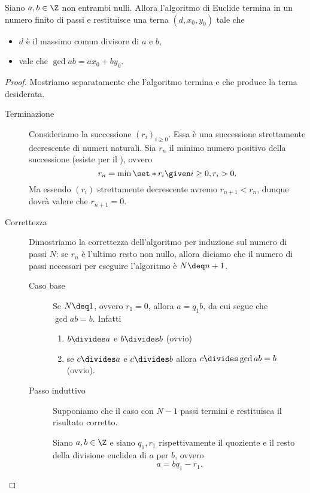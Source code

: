 \begin{theorem}
    Siano $a, b \in \Z$ non entrambi nulli. Allora l'algoritmo di Euclide termina in un numero finito di passi e restituisce una terna $(d, x_0, y_0)$ tale che \begin{itemize}
        \item $d$ è il massimo comun divisore di $a$ e $b$,
        \item vale che $\gcd{a}{b} = ax_0 + by_0$.
    \end{itemize}
\end{theorem}
\begin{proof}
    Mostriamo separatamente che l'algoritmo termina e che produce la terna desiderata.
    \begin{description}
        \item[Terminazione] Consideriamo la successione $(r_i)_{i\geq 0}$. Essa è una successione strettamente decrescente di numeri naturali. Sia $r_n$ il minimo numero positivo della successione (esiste per il ), ovvero \[
            r_n = \min \set*{r_i \given i \geq 0, r_i > 0}.    
        \] Ma essendo $(r_i)$ strettamente decrescente avremo $r_{n+1} < r_n$, dunque dovrà valere che $r_{n+1} = 0$.
        \item[Correttezza] Dimostriamo la correttezza dell'algoritmo per induzione sul numero di passi $N$: se $r_n$ è l'ultimo resto non nullo, allora diciamo che il numero di passi necessari per eseguire l'algoritmo è $N \deq n+1$. 
        \begin{description}
            \item[Caso base] Se $N \deq 1$, ovvero $r_1 = 0$, allora $a = q_1b$, da cui segue che $\gcd{a}{b} = b$. Infatti
            \begin{enumerate}[label={\roman*}]
                \item $b \divides a$ e $b \divides b$ (ovvio)
                \item se $c \divides a$ e $c \divides b$ allora $c \divides \gcd{a}{b} = b$ (ovvio).
            \end{enumerate} 
            \item[Passo induttivo] Supponiamo che il caso con $N - 1$ passi termini e restituisca il risultato corretto.
            
            Siano $a, b \in \Z$ e siano $q_1, r_1$ rispettivamente il quoziente e il resto della divisione euclidea di $a$ per $b$, ovvero \[
                a = bq_1 - r_1.    
            \]
            

\end{description}
\end{description}
\end{proof}
